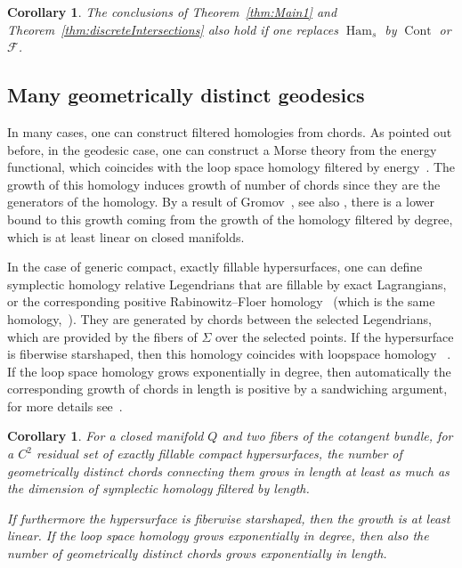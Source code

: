 \documentclass{amsart}
\newcommand{\Fcal}{{\mathcal{F}}}
\newcommand{\Cont}{\operatorname{Cont}}
\newcommand{\Ham}{\operatorname{Ham}}
\newtheorem{corollary}[theorem]{Corollary}
\theoremstyle{definition}
\theoremstyle{remark}
\numberwithin{equation}{section}
\begin{document}
\begin{corollary}\label{cor:main}
    The conclusions of Theorem~\ref{thm:Main1} and Theorem~\ref{thm:discreteIntersections} also hold if one replaces $\Ham_s$ by $\Cont$ or $\Fcal$. 
\end{corollary}

\subsection{Many geometrically distinct geodesics}
In many cases, one can construct filtered homologies from chords. As pointed out before, in the geodesic case, one can construct a Morse theory from the energy functional, which coincides with the loop space homology filtered by energy~\cite{M}. The growth of this homology induces growth of number of chords since they are the generators of the homology. By a result of Gromov~\cite{Gromov}, see also \cite[Theorem 5.10]{paternain1999geodesic}, there is a lower bound to this growth coming from the growth of the homology filtered by degree, which is at least linear on closed manifolds.

In the case of generic compact, exactly fillable hypersurfaces, one can define symplectic homology relative Legendrians that are fillable by exact Lagrangians, or the corresponding positive Rabinowitz--Floer homology~\cite{CF09} (which is the same homology,~\cite{CFO}). They are generated by chords between the selected Legendrians, which are provided by the fibers of $\Sigma$ over the selected points. If the hypersurface is fiberwise starshaped, then this homology coincides with loopspace homology ~\cite{AS}. If the loop space homology grows exponentially in degree, then automatically the corresponding growth of chords in length is positive by a sandwiching argument, for more details see~\cite{MacSch}.  

\begin{corollary}
    For a closed manifold $Q$ and two fibers of the cotangent bundle, for a $C^2$ residual set of exactly fillable compact hypersurfaces, the number of geometrically distinct chords connecting them grows in length at least as much as the dimension of symplectic homology filtered by length.

    If furthermore the hypersurface is fiberwise starshaped, then the growth is at least linear. If the loop space homology grows exponentially in degree, then also the number of geometrically distinct chords grows exponentially in length. 
\end{corollary}
\end{document}
